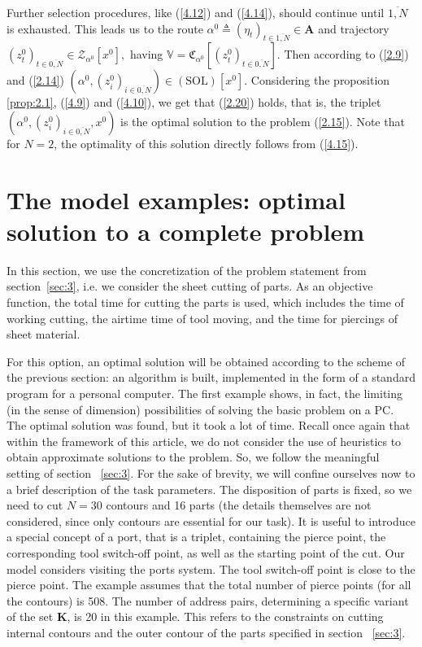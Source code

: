 \documentclass[numbers,sort&compress]{IntechOpen-Book}%
\begin{document}
Further selection procedures,
like (\ref{4.12}) and (\ref{4.14}),
should continue until
$\overline{1, N}$ is exhausted.
This leads us to the route
$\alpha^0 {\triangleq} (\eta_t)_{t \in \overline{1,N}} \in \mathbf{A}$
and trajectory
$(z_t^0)_{t \in \overline{0,N}} \in \mathcal{Z}_{\alpha^0}[x^0],$
having
$\mathbb{V} = \mathfrak{C}_{\alpha^0}[(z_t^0)_{t \in \overline{0,N}}]$.
Then according to
 (\ref{2.9}) and (\ref{2.14})
$(\alpha^0,(z_i^0)_{i \in \overline{0,N}}) \in (\mathrm{\mathrm{SOL}})[x^0]$.
Considering the proposition
\ref{prop:2.1}, (\ref{4.9}) and (\ref{4.10}),
we get that (\ref{2.20}) holds,
that is, the triplet
$(\alpha^0,(z_i^0)_{i \in \overline{0,N}},x^0)$
is the optimal solution to the problem
 (\ref{2.15}).
Note that
for $ N = 2 $,
the optimality of this solution directly follows from
 (\ref{4.15}).

\section{ The model examples: optimal solution to a complete problem}
\label{sec:5}

In this section, we use the concretization of the problem statement from section~\ref{sec:3}, i.e. we consider the sheet cutting of parts. As an objective function, the total time for cutting the parts is used, which includes the time of working cutting, the airtime time of tool moving, and the time for piercings of sheet material.

For this option, an optimal solution will be obtained according to the scheme of the previous section: an algorithm is built, implemented in the form of a standard program for a personal computer. The ﬁrst example shows, in fact, the limiting (in the sense of dimension) possibilities of solving the basic problem on a PC. The optimal solution was found, but it took a lot of time.  Recall once again that within the framework of this article, we do not consider the use of heuristics to obtain approximate solutions to the problem.
So, we follow the meaningful setting of section ~\ref{sec:3}.
For the sake of brevity,
we will confine ourselves now to a brief description of the task parameters.
The disposition of parts is fixed,
so we need to cut
$N = 30$
contours
and 16 parts
(the details themselves are not considered,
since only contours are essential for our task).
It is useful to introduce a special concept of a port,
that is a triplet,
containing the pierce point,
the corresponding tool switch-off point,
as well as the starting point of the cut.
Our model considers
visiting the ports system.
The tool switch-off point is close to the pierce point.
The example assumes that the total number of pierce points
(for all the contours)
is 508.
The number of address pairs,
determining a specific variant of the set
$\mathbf{K}$,
is 20
in this example.
This refers to 
the constraints
on cutting internal contours
and the outer contour of the parts specified in section ~\ref{sec:3}.
\end{document}
